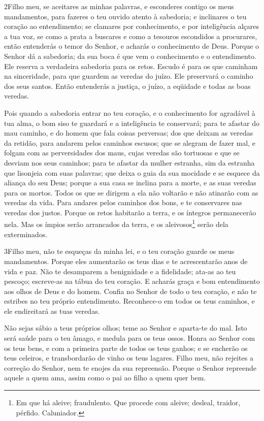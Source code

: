 \medskip

\lettrine{2}{}Filho meu, se aceitares as minhas palavras, e
esconderes contigo os meus mandamentos, para fazeres o teu
ouvido atento à sabedoria; e inclinares o teu coração ao
entendimento; se clamares por conhecimento, e por inteligência
alçares a tua voz, se como a prata a buscares e como a tesouros
escondidos a procurares, então entenderás o temor do Senhor, e
acharás o conhecimento de Deus. Porque o Senhor dá a sabedoria;
da sua boca é que vem o conhecimento e o entendimento. Ele
reserva a verdadeira sabedoria para os retos. Escudo é para os que
caminham na sinceridade, para que guardem as veredas do juízo.
Ele preservará o caminho dos seus santos. Então entenderás a
justiça, o juízo, a eqüidade e todas as boas veredas.

Pois quando a sabedoria entrar no teu coração, e o conhecimento
for agradável à tua alma, o bom siso te guardará e a
inteligência te conservará; para te afastar do mau caminho, e
do homem que fala coisas perversas; dos que deixam as veredas
da retidão, para andarem pelos caminhos escusos; que se
alegram de fazer mal, e folgam com as perversidades dos maus,
cujas veredas são tortuosas e que se desviam nos seus
caminhos; para te afastar da mulher estranha, sim da estranha
que lisonjeia com suas palavras; que deixa o guia da sua
mocidade e se esquece da aliança do seu Deus; porque a sua
casa se inclina para a morte, e as suas veredas para os mortos.
Todos os que se dirigem a ela não voltarão e não atinarão com
as veredas da vida. Para andares pelos caminhos dos bons, e
te conservares nas veredas dos justos. Porque os retos
habitarão a terra, e os íntegros permanecerão nela. Mas os
ímpios serão arrancados da terra, e os aleivosos\footnote{Em que há
aleive; fraudulento. Que procede com aleive; desleal, traidor,
pérfido. Caluniador.} serão dela exterminados.

\medskip

\lettrine{3}{}Filho meu, não te esqueças da minha lei, e o teu
coração guarde os meus mandamentos. Porque eles aumentarão os
teus dias e te acrescentarão anos de vida e paz. Não te
desamparem a benignidade e a fidelidade; ata-as ao teu pescoço;
escreve-as na tábua do teu coração. E acharás graça e bom
entendimento aos olhos de Deus e do homem. Confia no Senhor de
todo o teu coração, e não te estribes no teu próprio entendimento.
Reconhece-o em todos os teus caminhos, e ele endireitará as tuas
veredas.

Não sejas sábio a teus próprios olhos; teme ao Senhor e aparta-te
do mal. Isto será saúde para o teu âmago, e medula para os teus
ossos. Honra ao Senhor com os teus bens, e com a primeira parte
de todos os teus ganhos; e se encherão os teus celeiros, e
transbordarão de vinho os teus lagares. Filho meu, não
rejeites a correção do Senhor, nem te enojes da sua repreensão.
Porque o Senhor repreende aquele a quem ama, assim como o pai
ao filho a quem quer bem.

